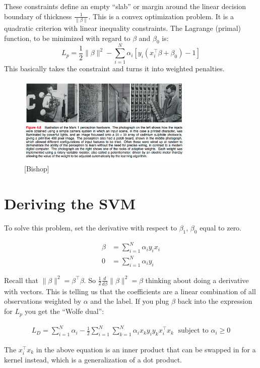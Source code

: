 \documentclass[a4paper]{article}
\begin{document}
These constraints define an empty ``slab'' or margin around the linear decision boundary of thickness $\frac{1}{\|\beta\|}$. This is a convex optimization problem. It is a quadratic criterion with linear inequality constraints. The Lagrange (primal) function, to be minimized with regard to $\beta$ and $\beta_0$ is:
$$L_p=\frac{1}{2}\|\beta\|^2-\sum_{i=1}^N\alpha_i[y_i(x_i^\top\beta+\beta_0)-1]$$
This basically takes the constraint and turns it into weighted penalties.


\begin{figure}
\centering
\includegraphics[width=0.75\textwidth]{bishop48.png}
\caption{\label{fig:bishop48}[Bishop]}
\end{figure}


\section{Deriving the SVM}

To solve this problem, set the derivative with respect to $\beta_1$, $\beta_0$ equal to zero.

\begin{align}
\beta &= \sum_{i=1}^{N} \alpha_i y_i x_i\\
0 &= \sum_{i=1}^{N} \alpha_i y_i
\end{align}

Recall that $\|\beta\|^2 = \beta^\top \beta$. So $\frac{1}{2} \frac{d}{d\beta} \|\beta\|^2 = \beta$ thinking about doing a derivative with vectors.  This is telling us that the coefficients are a linear combination of all observations weighted by $\alpha$ and the label.  If you plug $\beta$ back into the expression for $L_p$ you get the ``Wolfe dual'':

\begin{align}
L_D = \sum_{i=1}^{N} \alpha_i - \frac{1}{2} \sum_{i=1}^{N} \sum_{k=1}^{N} \alpha_i x_k y_i y_k x_i^\top x_k \;
\text{ subject to } \alpha_i \geq 0
\end{align}

The $x_i^\top x_k$ in the above equation is an inner product that can be swapped in for a kernel instead, which is a generalization of a dot product.
\end{document}
